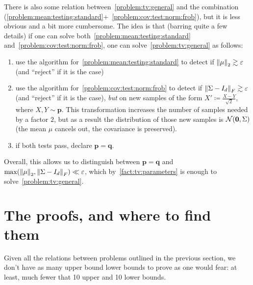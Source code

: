 \documentclass[10pt]{article}
\newcommand{\dst}{\varepsilon}
\newcommand{\dims}{d}
\newcommand{\p}{\mathbf{p}}
\newcommand{\q}{\mathbf{q}}
\renewcommand{\eqdef}{\coloneqq}
\theoremstyle{plain}
\begin{document}
\begin{remark}
  There is also some relation between~\autoref{problem:tv:general} and the combination (\autoref{problem:mean:testing:standard}+~\autoref{problem:cov:test:norm:frob}), but it is less obvious and a bit more cumbersome. The idea is that (barring quite a few details) if one can solve both~\autoref{problem:mean:testing:standard} and~\autoref{problem:cov:test:norm:frob}, one can solve~\autoref{problem:tv:general} as follows:
  \begin{enumerate}
    \item use the algorithm for~\autoref{problem:mean:testing:standard} to detect if $\normtwo{\mu}\gtrsim \dst$ (and ``reject'' if it is the case)
    \item use the algorithm for~\autoref{problem:cov:test:norm:frob} to detect if $\norm{\Sigma-I_\dims}_F\gtrsim \dst$ (and ``reject'' if it is the case), \emph{but} on new samples of the form $X'\eqdef \frac{X-Y}{\sqrt{2}}$, where $X,Y\sim\p$. This transformation increases the number of samples needed by a factor $2$, but as a result the distribution of those new samples is $ \mathcal{N}\!\left(\mathbf{0},\Sigma\right) $ (the mean $\mu$ cancels out, the covariance is preserved).
    \item if both tests pass, declare $\p=\q$.
  \end{enumerate}
  Overall, this allows us to distinguish between $\p=\q$ and $\max(\normtwo{\mu},\norm{\Sigma-I_\dims}_F) \ll \dst$, which by~\autoref{fact:tv:parameters} is enough to solve~\autoref{problem:tv:general}.
\end{remark}

\section{The proofs, and where to find them}
Given all the relations between problems outlined in the previous section, we don't have as many upper bound lower bounds to prove as one would fear: at least, much fewer that 10 upper and 10 lower bounds.
\end{document}
